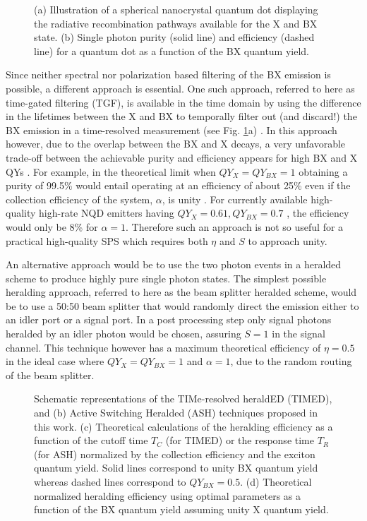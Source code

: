 \documentclass[journal=nalefd,manuscript=letter]{achemso}
\begin{document}
\begin{figure}[ht!]
\caption{(a) Illustration of a spherical nanocrystal quantum dot displaying the radiative recombination pathways available for the X and BX state. (b) Single photon purity (solid line) and efficiency (dashed line) for a quantum dot as a function of the BX quantum yield.  }
\label{fig:QDandTGF}
\end{figure}




Since neither spectral nor polarization based filtering of the BX emission is possible, a different approach is essential. 
One such approach, referred to here as time-gated filtering (TGF), is available in the time domain by using the difference in the lifetimes between the X and BX  to temporally filter out (and discard!) the BX emission in a time-resolved measurement (see Fig. \ref{fig:QDandTGF}a) \cite{Mangum2013DisentanglingExperiments.,Feng2017PurificationDots}.
In this approach however, due to the overlap between the BX and X decays, a very unfavorable  trade-off between the achievable purity and efficiency appears for high BX and X QYs .
For example, in the theoretical limit when $QY_X=QY_{BX}=1$ obtaining a purity of 99.5\% would entail operating at an efficiency of about 25\% even if the collection efficiency of the system, $\alpha$, is unity  \cite{supp}. For currently available high-quality high-rate NQD emitters having $QY_X=0.61,QY_{BX}=0.7$ \cite{Matsuzaki2017StrongAntenna}, the efficiency would only be 8\% for $\alpha=1$.    
Therefore such an approach is not so useful for a practical high-quality SPS which requires both $\eta$ and $S$ to approach unity. 

An alternative approach would be to use the two photon events in a heralded scheme to produce highly pure single photon states.
The simplest possible heralding approach, referred to here as the beam splitter heralded scheme, would be to use a 50:50 beam splitter that would randomly direct the emission either to an idler port or a signal port. 
In a post processing step only signal photons heralded by an idler photon would be chosen, assuring $S=1$ in the signal channel.
This technique however has a maximum theoretical efficiency of $\eta=0.5$ in the ideal case where $QY_{X}=QY_{BX}=1$ and $\alpha=1$, due to the random routing of the beam splitter. 

\begin{figure*}[t]
\caption{Schematic representations of the TIMe-resolved heraldED (TIMED), and (b) Active Switching Heralded (ASH) techniques proposed in this work. (c) Theoretical calculations of the heralding efficiency as a function of the cutoff time $T_C$ (for TIMED) or the response time $T_R$ (for ASH) normalized by the collection efficiency and the exciton quantum yield. Solid lines correspond to unity BX quantum yield whereas dashed lines correspond to $QY_{BX}=0.5$.  (d) Theoretical normalized heralding efficiency  using optimal parameters as a function of the BX quantum yield assuming unity X quantum yield. }
\label{fig:theoretical}
\end{figure*}
\end{document}

